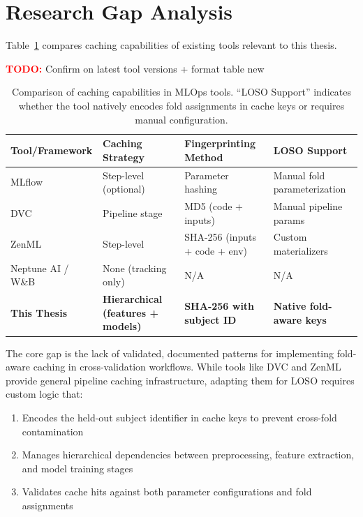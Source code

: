 \documentclass{imc-inf} %
\begin{document}
\section{Research Gap Analysis}

Table~\ref{tab:related_works_comparison} compares caching capabilities of 
existing tools relevant to this thesis.


\begin{center}
\colorbox{red!20}{%
\begin{minipage}{0.9\textwidth}
\textcolor{red}{\textbf{TODO:}} Confirm on latest tool versions + format table new
\end{minipage}
}
\end{center}


\begin{table}[ht]
\centering
\begin{tabular}{|p{2.5cm}|p{2.5cm}|p{2.5cm}|p{5cm}|}
\hline
\textbf{Tool/Framework} & \textbf{Caching Strategy} & \textbf{Fingerprinting Method} & \textbf{LOSO Support} \\
\hline
MLflow & Step-level (optional) & Parameter hashing & Manual fold parameterization \\
\hline
DVC & Pipeline stage & MD5 (code + inputs) & Manual pipeline params \\
\hline
ZenML & Step-level & SHA-256 (inputs + code + env) & Custom materializers \\
\hline
Neptune AI / W\&B & None (tracking only) & N/A & N/A \\
\hline
\textbf{This Thesis} & \textbf{Hierarchical (features + models)} & \textbf{SHA-256 with subject ID} & \textbf{Native fold-aware keys} \\
\hline
\end{tabular}
\caption{Comparison of caching capabilities in MLOps tools. ``LOSO Support'' 
indicates whether the tool natively encodes fold assignments in cache keys 
or requires manual configuration.}
\label{tab:related_works_comparison}
\end{table}

The core gap is the lack of validated, documented patterns for 
implementing fold-aware caching in cross-validation workflows. While tools 
like DVC and ZenML provide general pipeline caching infrastructure, adapting 
them for LOSO requires custom logic that:
\begin{enumerate}
\item Encodes the held-out subject identifier in cache keys to prevent 
      cross-fold contamination
\item Manages hierarchical dependencies between preprocessing, feature 
      extraction, and model training stages
\item Validates cache hits against both parameter configurations and 
      fold assignments
\end{enumerate}
\end{document}
